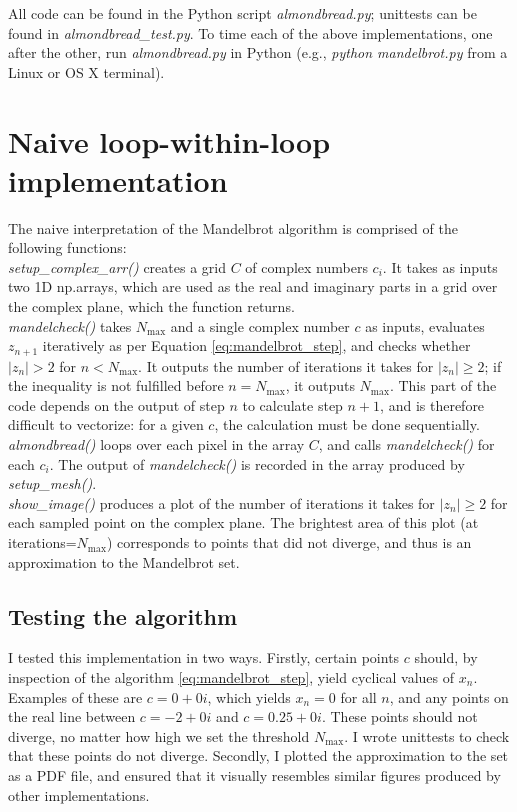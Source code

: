 \documentclass[paper=a4, fontsize=11pt]{scrartcl} %
\numberwithin{equation}{section} %
\numberwithin{figure}{section} %
\numberwithin{table}{section} %
\begin{document}
All code can be found in the Python script \emph{almondbread.py}; unittests can be found in \emph{almondbread\_test.py}. To time each of the above implementations, one after the other, run \emph{almondbread.py} in Python (e.g., \emph{python mandelbrot.py} from a Linux or OS X terminal).

\section{Naive loop-within-loop implementation}\label{sec:naive}

The naive interpretation of the Mandelbrot algorithm is comprised of the following functions:\\ 

\emph{setup\_complex\_arr()} creates a grid $C$ of complex numbers $c_i$. It takes as inputs two 1D np.arrays, which are used as the real and imaginary parts in a grid over the complex plane, which the function returns.\\

\emph{mandelcheck()} takes $N_\mathrm{max}$ and a single complex number $c$ as inputs, evaluates $z_{n+1}$ iteratively as per Equation \ref{eq:mandelbrot_step}, and checks whether $|z_n|>2$ for $n<N_\mathrm{max}$. It outputs the number of iterations it takes for $|z_n|\ge2$; if the inequality is not fulfilled before $n=N_\mathrm{max}$, it outputs $N_\mathrm{max}$. This part of the code depends on the output of step $n$ to calculate step $n+1$, and is therefore difficult to vectorize: for a given $c$, the calculation must be done sequentially.\\

\emph{almondbread()} loops over each pixel in the array $C$, and calls \emph{mandelcheck()} for each $c_i$. The output of \emph{mandelcheck()} is recorded in the array produced by \emph{setup\_mesh()}.\\

\emph{show\_image()} produces a plot of the number of iterations it takes for $|z_n|\ge2$ for each sampled point on the complex plane. The brightest area of this plot (at iterations=$N_\mathrm{max}$) corresponds to points that did not diverge, and thus is an approximation to the Mandelbrot set.

\subsection{Testing the algorithm}

I tested this implementation in two ways. Firstly, certain points $c$ should, by inspection of the algorithm \ref{eq:mandelbrot_step}, yield cyclical values of $x_n$. Examples of these are $c=0+0i$, which yields $x_n=0$ for all $n$, and any points on the real line between $c=-2+0i$ and $c=0.25+0i$. These points should not diverge, no matter how high we set the threshold $N_\mathrm{max}$. I wrote unittests to check that these points do not diverge. Secondly, I plotted the approximation to the set as a PDF file, and ensured that it visually resembles similar figures produced by other implementations.
\end{document}
